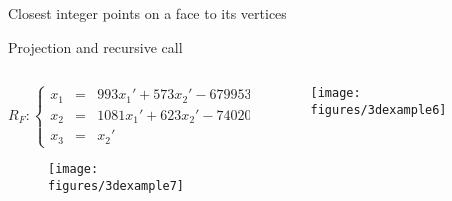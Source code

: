 \begin{frame}{Closest integer points on a face to its vertices}
	\begin{block}{Projection and recursive call}
		\begin{columns}
		\begin{column}{0.5\textwidth}
			{\scriptsize
				\begin{equation*}
					R_F: \left\{ \begin{array}{rcl} 
						x_1 &=& 993 x_1' + 573 x_2' - 67995300\\
						x_2 &=& 1081 x_1' + 623 x_2' - 74020200\\
						x_3 &=& x_2'
					\end{array} \right.
				\end{equation*}
			}
			
			\begin{center}
				\begin{figure}[H]
					\texttt{[image: figures/3dexample7]}
				\end{figure}	
			\end{center}
		\end{column}
		\hfill
		\begin{column}{0.5\textwidth}
			\begin{center}
				\begin{figure}[H]
					\texttt{[image: figures/3dexample6]}
				\end{figure}
				
			\end{center}
			
		\end{column}
	\end{columns}
		
	\end{block}
\end{frame}

